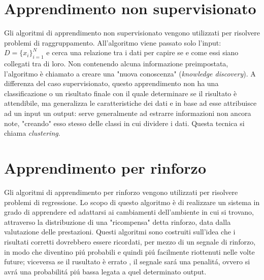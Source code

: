 \documentclass[a4paper,12pt]{report}
\begin{document}
\section{Apprendimento non supervisionato}
Gli algoritmi di apprendimento non supervisionato vengono utilizzati per risolvere problemi di raggruppamento.
All'algoritmo viene passato solo l'input: $D={\{ x_{i}\}}^{N}_{i=1}$ e cerca una relazione tra i dati per capire se e come essi siano collegati tra di loro. Non contenendo alcuna informazione preimpostata, l'algoritmo \`e chiamato a creare una "nuova conoscenza" (\textit{knowledge discovery}). A differenza del caso supervisionato, questo apprendimento non ha una classificazione o un risultato finale con il quale determinare se il risultato \`e attendibile, ma generalizza le caratteristiche dei dati e in base ad esse attribuisce ad un input un output: serve generalmente ad estrarre informazioni non ancora note, "creando" esso stesso delle classi in cui dividere i dati. Questa tecnica si chiama \textit{clustering}.

\section{Apprendimento per rinforzo}
Gli algoritmi di apprendimento per rinforzo vengono utilizzati per risolvere problemi di regressione.
Lo scopo di questo algoritmo \`e di realizzare un sistema in grado di apprendere ed adattarsi ai cambiamenti dell'ambiente in cui si trovano, attraverso la distribuzione di una "ricompensa" detta rinforzo, data dalla valutazione delle prestazioni. Questi algoritmi sono costruiti sull'idea che i risultati corretti dovrebbero essere ricordati, per mezzo di un segnale di rinforzo, in modo che diventino pi\'{u} probabili e quindi pi\'{u} facilmente riottenuti nelle volte future; viceversa se il rusultato \`e errato , il segnale sar\'{a} una penalit\'{a}, ovvero si avr\'{a} una probabilit\'{a} pi\'{u} bassa legata a quel determinato output.\cite{rinforzo}
\end{document}
